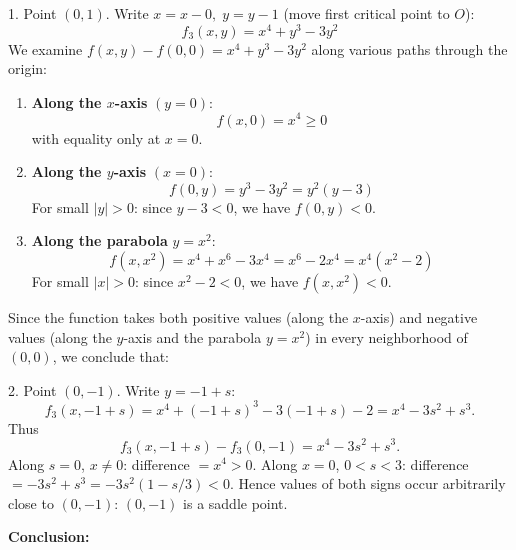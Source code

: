 \begin{answer}
\begin{answerenum}
            1. Point $(0,1)$. Write $x=x-0, \; y=y-1$ (move first critical point to \(O\)):
            \[
            f_3(x,y)= x^4 + y^3 - 3y^2
            \]
            We examine $f(x,y) - f(0,0) = x^4 + y^3 - 3y^2$ along various paths through the origin:
            \begin{enumerate}
            \item \textbf{Along the $x$-axis} $(y = 0)$:
            \[
            f(x,0) = x^4 \geq 0
            \]
            with equality only at $x = 0$.

            \item \textbf{Along the $y$-axis} $(x = 0)$:
            \[
            f(0,y) = y^3 - 3y^2 = y^2(y - 3)
            \]
            For small $|y| > 0$: since $y - 3 < 0$, we have $f(0,y) < 0$.

            \item \textbf{Along the parabola} $y = x^2$:
            \[
            f(x,x^2) = x^4 + x^6 - 3x^4 = x^6 - 2x^4 = x^4(x^2 - 2)
            \]
            For small $|x| > 0$: since $x^2 - 2 < 0$, we have $f(x,x^2) < 0$.
            \end{enumerate}
            Since the function takes both positive values (along the $x$-axis) and negative values (along the $y$-axis and the parabola $y = x^2$) in every neighborhood of $(0,0)$, we conclude that:
            \begin{center}
            \end{center}
            
            2. Point $(0,-1)$. Write $y=-1+s$:
            \[
            f_3(x,-1+s)= x^4 + (-1+s)^3 -3(-1+s) -2 = x^4 -3 s^2 + s^3.
            \]
            Thus
            \[
            f_3(x,-1+s)-f_3(0,-1)= x^4 -3 s^2 + s^3.
            \]
            Along $s=0$, $x\neq 0$: difference $=x^4>0$. Along $x=0$, $0< s <3$: difference $= -3s^2 + s^3 = -3s^2(1 - s/3)<0$. Hence values of both signs occur arbitrarily close to $(0,-1)$: $(0,-1)$ is a saddle point.

            \textbf{Conclusion:}
            \begin{center}
            \end{center}

    \end{answerenum}
\end{answer}